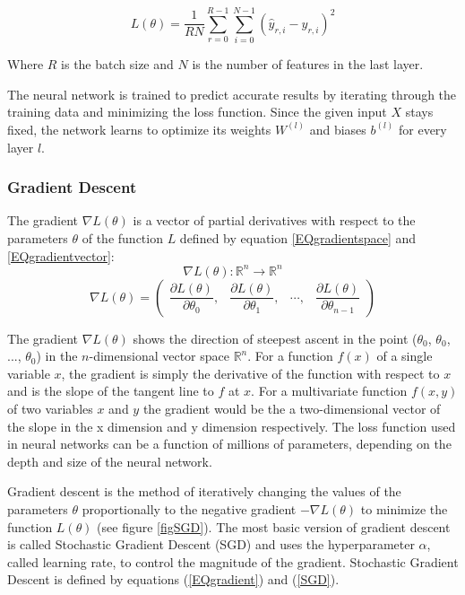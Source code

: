 \documentclass[a4paper,11pt,twoside]{article}
\newcommand*{\pd}[2]{\ensuremath{\dfrac{\partial #1}{\partial #2}}}
\begin{document}
\begin{equation}\label{MSE}
L(\theta) = \frac{1}{RN} \sum^{R-1}_{r=0} \sum^{N-1}_{i=0} (\hat{y}_{r,i}-y_{r,i})^2
\end{equation}

Where $R$ is the batch size and $N$ is the number of features in the last layer.

The neural network is trained to predict accurate results by iterating through the training data and minimizing the loss function. Since the given input $X$ stays fixed, the network learns to optimize its weights $W^{(l)}$ and biases $b^{(l)}$ for every layer $l$. \cite{cs231n} \cite{wikiStanford}

\subsubsection{Gradient Descent}
The gradient $\nabla L(\theta)$ is a vector of partial derivatives with respect to the parameters $\theta$ of the function $L$ defined by equation \eqref{EQgradientspace} and \eqref{EQgradientvector}: \cite{gradient} \cite{convmath} 
\begin{equation}\label{EQgradientspace}
\nabla L(\theta) : \mathbb{R}^n \to \mathbb{R}^n
\end{equation}
\begin{equation}\label{EQgradientvector}
\nabla L(\theta) = 
	\begin{pmatrix} 
		\pd{L(\theta)}{\theta_{0}}, & 
		\pd{L(\theta)}{\theta_{1}}, &
		\cdots, &
		\pd{L(\theta)}{\theta_{n-1}}
		
		\end{pmatrix}
\end{equation}

The gradient $\nabla L(\theta)$ shows the direction of steepest ascent in the point ($\theta_{0}$, $\theta_{0}$, ..., $\theta_{0}$) in the $n$-dimensional vector space $\mathbb{R}^{n}$. For a function $f(x)$ of a single variable $x$, the gradient is simply the derivative of the function with respect to $x$ and is the slope of the tangent line to $f$ at $x$. For a multivariate function $f(x,y)$ of two variables $x$ and $y$ the gradient would be the a two-dimensional vector of the slope in the x dimension and y dimension respectively. The loss function used in neural networks can be a function of millions of parameters, depending on the depth and size of the neural network. \cite{gradient} \cite{convmath} 

Gradient descent is the method of iteratively changing the values of the parameters $\theta$ proportionally to the negative gradient $-\nabla L(\theta)$ to minimize the function $L(\theta)$ (see figure \ref{figSGD}). The most basic version of gradient descent is called Stochastic Gradient Descent (SGD) and uses the hyperparameter $\alpha$, called learning rate, to control the magnitude of the gradient. Stochastic Gradient Descent is defined by equations (\ref{EQgradient}) and (\ref{SGD}). \cite{gradient} \cite{convmath} \cite{wikiStanford}
\end{document}
